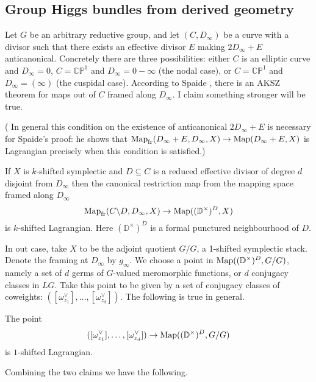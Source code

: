 \documentclass[12pt,psamsfonts,reqno]{amsart}
\begin{document}
\begin{remark}
\section{Group Higgs bundles from derived geometry}

Let $G$ be an arbitrary reductive group, and let $(C,D_\infty)$ be a curve with a divisor such that there exists an effective divisor $E$ making $2D_\infty+E$ anticanonical.  Concretely there are three possibilities: either $C$ is an elliptic curve and $D_\infty = 0$, $C = \mathbb{CP}^1$ and $D_\infty=0-\infty$ (the nodal case), or $C=\mathbb{CP}^1$ and $D_\infty = (\infty)$ (the cuspidal case).  According to Spaide \cite{Spaide2016}, there is an AKSZ theorem for maps out of $C$ framed along $D_\infty$.  I claim something stronger will be true.

( In general this condition on the existence of anticanonical $2D_\infty + E$ is necessary for Spaide's proof: he shows that $\operatorname{Map}_{\mathrm{fr}}(D_\infty + E, D_\infty, X) \to \operatorname{Map}(D_\infty + E, X)$ is Lagrangian precisely when this condition is satisfied.)


\begin{claim}
If $X$ is $k$-shifted symplectic and $D \subseteq C$ is a reduced effective divisor of degree $d$ disjoint from $D_\infty$ then the canonical restriction map from the mapping space framed along $D_\infty$
\[\operatorname{Map}_{\mathrm{fr}}(C \backslash D, D_\infty, X) \to \operatorname{Map}((\mathbb{D}^\times)^D, X)\]
is $k$-shifted Lagrangian.  Here $(\mathbb{D}^\times)^D$ is a formal punctured neighbourhood of $D$.
\end{claim}

In out case, take $X$ to be the adjoint quotient $G/G$, a 1-shifted symplectic stack.  Denote the framing at $D_\infty$ by $g_\infty$.  We choose a point in $\operatorname{Map}((\mathbb{D}^\times)^D, G/G)$, namely a set of $d$ germs of $G$-valued meromorphic functions, or $d$ conjugacy classes in $LG$.  Take this point to be given by a set of conjugacy classes of coweights: $([\omega_{z_1}^\vee], \ldots, [\omega_{z_d}^\vee])$.  The following is true in general.

\begin{claim}
The point 
\[([\omega_{z_1}^\vee], \ldots, [\omega_{z_d}^\vee]) \to \operatorname{Map}((\mathbb{D}^\times)^D, G/G)\]
is $1$-shifted Lagrangian.
\end{claim}

Combining the two claims we have the following.


\end{remark}
\end{document}
